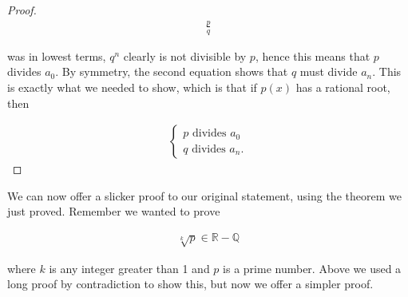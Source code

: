 \documentclass[twoside]{report}
\begin{document}
\begin{proof}
	\begin{align*}
		\frac{p}{q}
	\end{align*}
	
	was in lowest terms, $q^n$ clearly is not divisible by $p$, hence this means that $p$ divides $a_0$. By symmetry, the second equation shows that $q$ must divide $a_n$. This is exactly what we needed to show, which is that if $p(x)$ has a rational root, then
	
	\begin{align*}
		\begin{cases}
			p \text{ divides } a_0 \\
			q \text{ divides } a_n.
		\end{cases}
	\end{align*}
\end{proof}
\vspace{\baselineskip}

We can now offer a slicker proof to our original statement, using the theorem we just proved. Remember we wanted to prove

\begin{align*}
	\sqrt[k]{p} \in \mathbb{R} - \mathbb{Q}
\end{align*}

where $k$ is any integer greater than 1 and $p$ is a prime number. Above we used a long proof by contradiction to show this, but now we offer a simpler proof.
\end{document}

